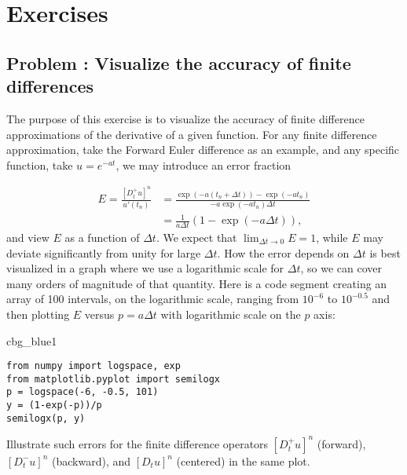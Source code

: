 \documentclass[graybox,sectrefs,envcountresetchap,open=right,final]{svmonodo}
\newenvironment{_cod_tight}[1]{
   \def\FrameCommand{\colorbox{#1}}
   \FrameRule0.6pt\MakeFramed {\FrameRestore}\vskip3mm}
   {\vskip0mm\endMakeFramed}
\newenvironment{cod}[1]{
\bgroup\rmfamily
\fboxsep=0mm\relax
\begin{_cod_tight}{#1}
\list{}{\parsep=-2mm\parskip=0mm\topsep=0pt\leftmargin=2mm
\rightmargin=2\leftmargin\leftmargin=4pt\relax}
\item\relax}
{\endlist\end{_cod_tight}\egroup}
\newenvironment{doconceexercise}{}{}
\newcounter{doconceexercisecounter}
\begin{document}

\section{Exercises}



\begin{doconceexercise}

\subsection*{Problem \thedoconceexercisecounter: Visualize the accuracy of finite differences}

\label{decay:analysis:exer:fd:exp:plot}

The purpose of this exercise is to visualize the accuracy of finite difference
approximations of the derivative of a given function.
For any finite difference approximation, take the Forward Euler difference
as an example, and any specific function, take  $u=e^{-at}$,
we may introduce an error fraction

\begin{align*}
E = \frac{[D_t^+ u]^n}{u'(t_n)} &= \frac{\exp{(-a(t_n+\Delta t))} - \exp{(-at_n)}}{-a\exp{(-at_n)\Delta t}}\\ 
&= \frac{1}{a\Delta t}\left(1 -\exp{(-a\Delta t)}\right),
\end{align*}
and view $E$ as a function of $\Delta t$. We expect that
$\lim_{\Delta t\rightarrow 0}E=1$, while $E$ may deviate significantly from
unity for large $\Delta t$. How the error depends on $\Delta t$ is best
visualized in a graph where we use a logarithmic scale for $\Delta t$,
so we can cover many orders of magnitude of that quantity. Here is
a code segment creating an array of 100 intervals, on the logarithmic
scale, ranging from $10^{-6}$ to $10^{-0.5}$ and then plotting $E$ versus
$p=a\Delta t$ with logarithmic scale on the $p$ axis:

\begin{cod}{cbg_blue1}\begin{Verbatim}[numbers=none,fontsize=\fontsize{9pt}{9pt},baselinestretch=0.95,xleftmargin=2mm]
from numpy import logspace, exp
from matplotlib.pyplot import semilogx
p = logspace(-6, -0.5, 101)
y = (1-exp(-p))/p
semilogx(p, y)
\end{Verbatim}
\end{cod}
\noindent
Illustrate such errors for the finite difference operators $[D_t^+u]^n$
(forward), $[D_t^-u]^n$ (backward), and $[D_t u]^n$ (centered) in
the same plot.


\end{doconceexercise}
\end{document}
